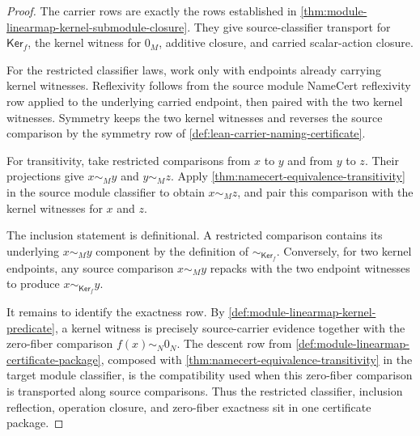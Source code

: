 \begin{proof}
The carrier rows are exactly the rows established in \autoref{thm:module-linearmap-kernel-submodule-closure}. They give source-classifier transport for $\mathsf{Ker}_f$, the kernel witness for $0_M$, additive closure, and carried scalar-action closure.

For the restricted classifier laws, work only with endpoints already carrying kernel witnesses. Reflexivity follows from the source module NameCert reflexivity row applied to the underlying carried endpoint, then paired with the two kernel witnesses. Symmetry keeps the two kernel witnesses and reverses the source comparison by the symmetry row of \autoref{def:lean-carrier-naming-certificate}.

For transitivity, take restricted comparisons from $x$ to $y$ and from $y$ to $z$. Their projections give $x\sim_My$ and $y\sim_Mz$. Apply \autoref{thm:namecert-equivalence-transitivity} in the source module classifier to obtain $x\sim_Mz$, and pair this comparison with the kernel witnesses for $x$ and $z$.

The inclusion statement is definitional. A restricted comparison contains its underlying $x\sim_My$ component by the definition of $\sim_{\mathsf{Ker}_f}$. Conversely, for two kernel endpoints, any source comparison $x\sim_My$ repacks with the two endpoint witnesses to produce $x\sim_{\mathsf{Ker}_f}y$.

It remains to identify the exactness row. By \autoref{def:module-linearmap-kernel-predicate}, a kernel witness is precisely source-carrier evidence together with the zero-fiber comparison $f(x)\sim_N0_N$. The descent row from \autoref{def:module-linearmap-certificate-package}, composed with \autoref{thm:namecert-equivalence-transitivity} in the target module classifier, is the compatibility used when this zero-fiber comparison is transported along source comparisons. Thus the restricted classifier, inclusion reflection, operation closure, and zero-fiber exactness sit in one certificate package.
\end{proof}

